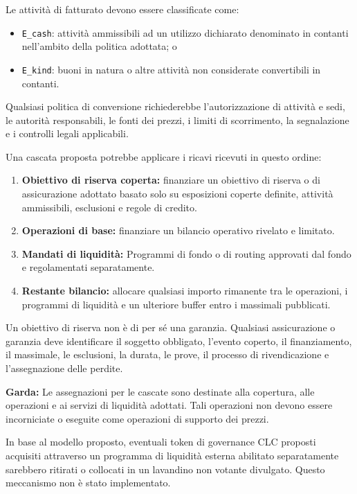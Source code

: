 \documentclass[11pt]{article}
\begin{document}
Le attività di fatturato devono essere classificate come:

\begin{itemize}[leftmargin=*]
\item \texttt{E\_cash}: attività ammissibili ad un utilizzo dichiarato denominato in contanti nell'ambito della politica adottata; o
\item \texttt{E\_kind}: buoni in natura o altre attività non considerate convertibili in contanti.
\end{itemize}
Qualsiasi politica di conversione richiederebbe l'autorizzazione di attività e sedi, le autorità responsabili, le fonti dei prezzi, i limiti di scorrimento, la segnalazione e i controlli legali applicabili.

Una cascata proposta potrebbe applicare i ricavi ricevuti in questo ordine:

\begin{enumerate}[leftmargin=*]
\item \textbf{Obiettivo di riserva coperta:} finanziare un obiettivo di riserva o di assicurazione adottato basato solo su esposizioni coperte definite, attività ammissibili, esclusioni e regole di credito.
\item \textbf{Operazioni di base:} finanziare un bilancio operativo rivelato e limitato.
\item \textbf{Mandati di liquidità:} Programmi di fondo o di routing approvati dal fondo e regolamentati separatamente.
\item \textbf{Restante bilancio:} allocare qualsiasi importo rimanente tra le operazioni, i programmi di liquidità e un ulteriore buffer entro i massimali pubblicati.
\end{enumerate}
Un obiettivo di riserva non è di per sé una garanzia. Qualsiasi assicurazione o garanzia deve identificare il soggetto obbligato, l'evento coperto, il finanziamento, il massimale, le esclusioni, la durata, le prove, il processo di rivendicazione e l'assegnazione delle perdite.

\textbf{Garda:} Le assegnazioni per le cascate sono destinate alla copertura, alle operazioni e ai servizi di liquidità adottati. Tali operazioni non devono essere incorniciate o eseguite come operazioni di supporto dei prezzi.

In base al modello proposto, eventuali token di governance CLC proposti acquisiti attraverso un programma di liquidità esterna abilitato separatamente sarebbero ritirati o collocati in un lavandino non votante divulgato. Questo meccanismo non è stato implementato.
\end{document}
